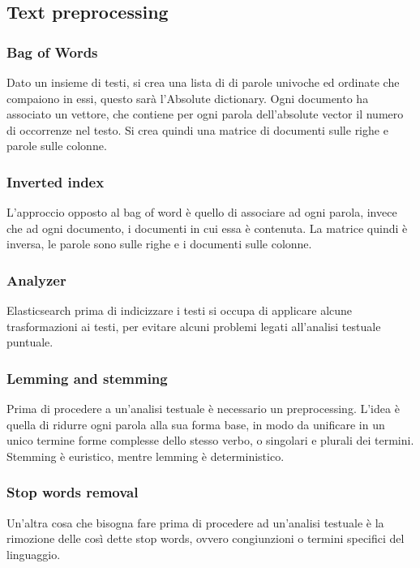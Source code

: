 \subsection{Text preprocessing}

\subsubsection{Bag of Words}
Dato un insieme di testi, si crea una lista di di parole univoche ed ordinate che compaiono in essi, 
questo sarà l'Absolute dictionary.
Ogni documento ha associato un vettore, che contiene per ogni parola dell'absolute vector
il numero di occorrenze nel testo.
Si crea quindi una matrice di documenti sulle righe e parole sulle colonne.

\subsubsection{Inverted index}
L'approccio opposto al bag of word è quello di associare ad ogni parola, invece che ad ogni 
documento, i documenti in cui essa è contenuta.
La matrice quindi è inversa, le parole sono sulle righe e i documenti sulle colonne.

\subsubsection{Analyzer}
Elasticsearch prima di indicizzare i testi si occupa di applicare alcune trasformazioni 
ai testi, per evitare alcuni problemi legati all'analisi testuale puntuale.

\subsubsection{Lemming and stemming}
Prima di procedere a un'analisi testuale è necessario un preprocessing.
L'idea è quella di ridurre ogni parola alla sua forma base, in modo da unificare in un 
unico termine forme complesse dello stesso verbo, o singolari e plurali dei termini.
Stemming è euristico, mentre lemming è deterministico.

\subsubsection{Stop words removal}
Un'altra cosa che bisogna fare prima di procedere ad un'analisi testuale è 
la rimozione delle così dette stop words, ovvero congiunzioni o termini specifici del 
linguaggio.

